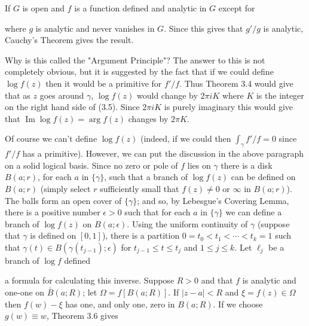 If $G$ is open and $f$ is a function defined and analytic in $G$ except for

where $g$ is analytic and never vanishes in $G$. Since this gives that $g'/g$ is analytic, Cauchy's Theorem gives the result.

Why is this called the "Argument Principle"? The answer to this is not completely obvious, but it is suggested by the fact that if we could define $\log f(z)$ then it would be a primitive for $f'/f$. Thus Theorem 3.4 would give that as $z$ goes around $\gamma$, $\log f(z)$ would change by $2\pi iK$ where $K$ is the integer on the right hand side of (3.5). Since $2\pi iK$ is purely imaginary this would give that $\operatorname{Im} \log f(z) = \arg f(z)$ changes by $2\pi K$.

Of course we can't define $\log f(z)$ (indeed, if we could then $\int_{\gamma} f'/f = 0$ since $f'/f$ has a primitive). However, we can put the discussion in the above paragraph on a solid logical basis. Since no zero or pole of $f$ lies on $\gamma$ there is a disk $B(a; r)$, for each $a$ in $\{\gamma\}$, such that a branch of $\log f(z)$ can be defined on $B(a; r)$ (simply select $r$ sufficiently small that $f(z) \neq 0$ or $\infty$ in $B(a; r)$). The balls form an open cover of $\{\gamma\}$; and so, by Lebesgue's Covering Lemma, there is a positive number $\epsilon > 0$ such that for each $a$ in $\{\gamma\}$ we can define a branch of $\log f(z)$ on $B(a; \epsilon)$. Using the uniform continuity of $\gamma$ (suppose that $\gamma$ is defined on $[0, 1]$), there is a partition $0 = t_0 < t_1 < \cdots < t_k = 1$ such that $\gamma(t) \in B(\gamma(t_{j-1}); \epsilon)$ for $t_{j-1} \leq t \leq t_j$ and $1 \leq j \leq k$. Let $\ell_j$ be a branch of $\log f$ defined

a formula for calculating this inverse. Suppose $R > 0$ and that $f$ is analytic and one-one on $\bar{B}(a; R)$; let $\Omega = f[B(a; R)]$. If $|z - a| < R$ and $\xi = f(z) \in \Omega$ then $f(w) - \xi$ has one, and only one, zero in $B(a; R)$. If we choose $g(w) \equiv w$, Theorem 3.6 gives